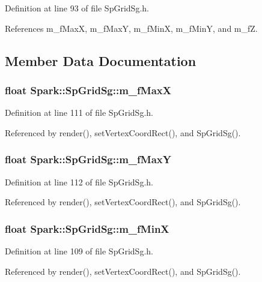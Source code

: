 Definition at line 93 of file Sp\-Grid\-Sg.h.

References m\_\-f\-Max\-X, m\_\-f\-Max\-Y, m\_\-f\-Min\-X, m\_\-f\-Min\-Y, and m\_\-f\-Z.

\subsection{Member Data Documentation}
\subsubsection{\setlength{\rightskip}{0pt plus 5cm}float {\bf Spark::Sp\-Grid\-Sg::m\_\-f\-Max\-X}\hspace{0.3cm}{\tt  [protected]}}\label{classSpark_1_1SpGridSg_p4}


Definition at line 111 of file Sp\-Grid\-Sg.h.

Referenced by render(), set\-Vertex\-Coord\-Rect(), and Sp\-Grid\-Sg().
\subsubsection{\setlength{\rightskip}{0pt plus 5cm}float {\bf Spark::Sp\-Grid\-Sg::m\_\-f\-Max\-Y}\hspace{0.3cm}{\tt  [protected]}}\label{classSpark_1_1SpGridSg_p5}


Definition at line 112 of file Sp\-Grid\-Sg.h.

Referenced by render(), set\-Vertex\-Coord\-Rect(), and Sp\-Grid\-Sg().
\subsubsection{\setlength{\rightskip}{0pt plus 5cm}float {\bf Spark::Sp\-Grid\-Sg::m\_\-f\-Min\-X}\hspace{0.3cm}{\tt  [protected]}}\label{classSpark_1_1SpGridSg_p2}


Definition at line 109 of file Sp\-Grid\-Sg.h.

Referenced by render(), set\-Vertex\-Coord\-Rect(), and Sp\-Grid\-Sg().
